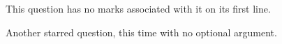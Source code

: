 \documentclass{ouab}
\begin{document}
This question has no marks associated with it on its first line.

\question*
Another starred question, this time with no optional argument.



\end{document}
